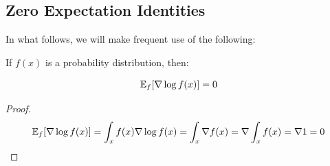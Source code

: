 \subsection{Zero Expectation Identities}
\label{sec:appendix:zeroexp}

In what follows, we will make frequent use of the following:

\begin{lemma}
If $f(x)$ is a probability distribution, then:

\begin{equation*}
\mathbb{E}_f[\nabla \log f(x)] = 0
\end{equation*}
\label{lem:zeroexp}
\end{lemma}
\begin{proof}
\begin{equation*}
\expect_f[\nabla \log f(x)]
%
= \int_x f(x) \nabla \log f(x)
%
= \int_x \nabla f(x)
%
= \nabla \int_x f(x)
%
= \nabla 1
%
= 0
\end{equation*}
\end{proof}

